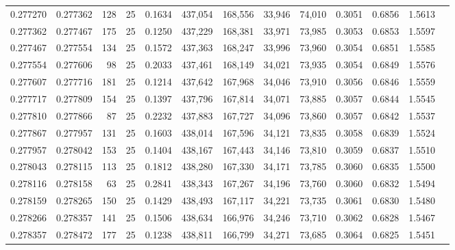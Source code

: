 \begin{tabular}{rrrrrrrrrrrrr}
0.277270 & 0.277362 &   128 &  25 &                                     0.1634 & 437,054 & 168,556 &  33,946 &  74,010 & 0.3051 & 0.6856 & 1.5613 \\
0.277362 & 0.277467 &   175 &  25 &                                     0.1250 & 437,229 & 168,381 &  33,971 &  73,985 & 0.3053 & 0.6853 & 1.5597 \\
0.277467 & 0.277554 &   134 &  25 &                                     0.1572 & 437,363 & 168,247 &  33,996 &  73,960 & 0.3054 & 0.6851 & 1.5585 \\
0.277554 & 0.277606 &    98 &  25 &                                     0.2033 & 437,461 & 168,149 &  34,021 &  73,935 & 0.3054 & 0.6849 & 1.5576 \\
0.277607 & 0.277716 &   181 &  25 &                                     0.1214 & 437,642 & 167,968 &  34,046 &  73,910 & 0.3056 & 0.6846 & 1.5559 \\
0.277717 & 0.277809 &   154 &  25 &                                     0.1397 & 437,796 & 167,814 &  34,071 &  73,885 & 0.3057 & 0.6844 & 1.5545 \\
0.277810 & 0.277866 &    87 &  25 &                                     0.2232 & 437,883 & 167,727 &  34,096 &  73,860 & 0.3057 & 0.6842 & 1.5537 \\
0.277867 & 0.277957 &   131 &  25 &                                     0.1603 & 438,014 & 167,596 &  34,121 &  73,835 & 0.3058 & 0.6839 & 1.5524 \\
0.277957 & 0.278042 &   153 &  25 &                                     0.1404 & 438,167 & 167,443 &  34,146 &  73,810 & 0.3059 & 0.6837 & 1.5510 \\
0.278043 & 0.278115 &   113 &  25 &                                     0.1812 & 438,280 & 167,330 &  34,171 &  73,785 & 0.3060 & 0.6835 & 1.5500 \\
0.278116 & 0.278158 &    63 &  25 &                                     0.2841 & 438,343 & 167,267 &  34,196 &  73,760 & 0.3060 & 0.6832 & 1.5494 \\
0.278159 & 0.278265 &   150 &  25 &                                     0.1429 & 438,493 & 167,117 &  34,221 &  73,735 & 0.3061 & 0.6830 & 1.5480 \\
0.278266 & 0.278357 &   141 &  25 &                                     0.1506 & 438,634 & 166,976 &  34,246 &  73,710 & 0.3062 & 0.6828 & 1.5467 \\
0.278357 & 0.278472 &   177 &  25 &                                     0.1238 & 438,811 & 166,799 &  34,271 &  73,685 & 0.3064 & 0.6825 & 1.5451 \\

\end{tabular}
